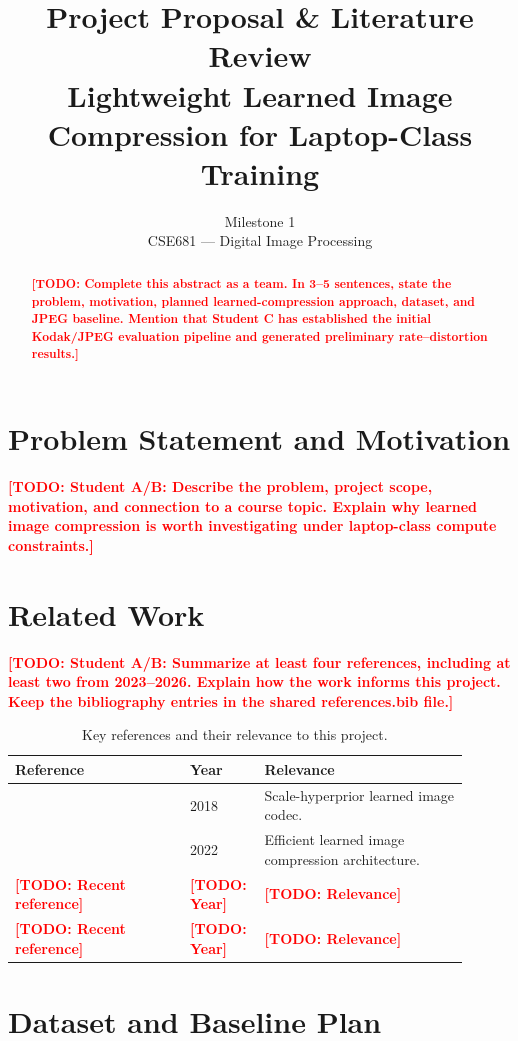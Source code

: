 \documentclass[11pt]{article}
\title{\LARGE Project Proposal \& Literature Review\\[4pt]
       \large Lightweight Learned Image Compression for Laptop-Class Training}
\author{\todo{Student A} \and \todo{Student B} \and \todo{Student C}}
\date{Milestone 1\\CSE681 --- Digital Image Processing}
\newcommand{\todo}[1]{\textcolor{red}{\textbf{[TODO: #1]}}}
\begin{document}
\maketitle

\begin{abstract}
\todo{Complete this abstract as a team. In 3--5 sentences, state the
problem, motivation, planned learned-compression approach, dataset,
and JPEG baseline. Mention that Student C has established the initial
Kodak/JPEG evaluation pipeline and generated preliminary rate--distortion
results.}
\end{abstract}

\section{Problem Statement and Motivation}
\todo{Student A/B: Describe the problem, project scope, motivation,
and connection to a course topic. Explain why learned image compression
is worth investigating under laptop-class compute constraints.}

\section{Related Work}
\todo{Student A/B: Summarize at least four references, including at least
two from 2023--2026. Explain how the work informs this project. Keep
the bibliography entries in the shared references.bib file.}

\begin{table}[htbp]
\centering
\caption{Key references and their relevance to this project.}
\begin{tabular}{@{}p{0.36\linewidth}p{0.12\linewidth}p{0.42\linewidth}@{}}
\toprule
\textbf{Reference} & \textbf{Year} & \textbf{Relevance} \\
\midrule
\citep{balle2018scalehyperprior} & 2018 &
Scale-hyperprior learned image codec. \\
\citep{he2022elic} & 2022 &
Efficient learned image compression architecture. \\
\todo{Recent reference} & \todo{Year} & \todo{Relevance} \\
\todo{Recent reference} & \todo{Year} & \todo{Relevance} \\
\bottomrule
\end{tabular}
\end{table}

\section{Dataset and Baseline Plan}
\end{document}
